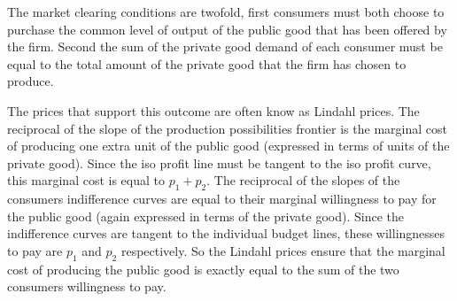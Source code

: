 \documentclass{article}
\begin{document}
The market clearing conditions are twofold, first consumers must both choose
to purchase the common level of output of the public good that has been
offered by the firm. Second the sum of the private good demand of each
consumer must be equal to the total amount of the private good that the firm
has chosen to produce.

The prices that support this outcome are often know as Lindahl prices. The
reciprocal of the slope of the production possibilities frontier is the
marginal cost of producing one extra unit of the public good (expressed in
terms of units of the private good). Since the iso profit line must be tangent
to the iso profit curve, this marginal cost is equal to $p_{1}+p_{2}$. The
reciprocal of the slopes of the consumers indifference curves are equal to
their marginal willingness to pay for the public good (again expressed in
terms of the private good). Since the indifference curves are tangent to the
individual budget lines, these willingnesses to pay are $p_{1}$ and $p_{2}$
respectively. So the Lindahl prices ensure that the marginal cost of producing
the public good is exactly equal to the sum of the two consumers willingness
to pay.
\end{document}
